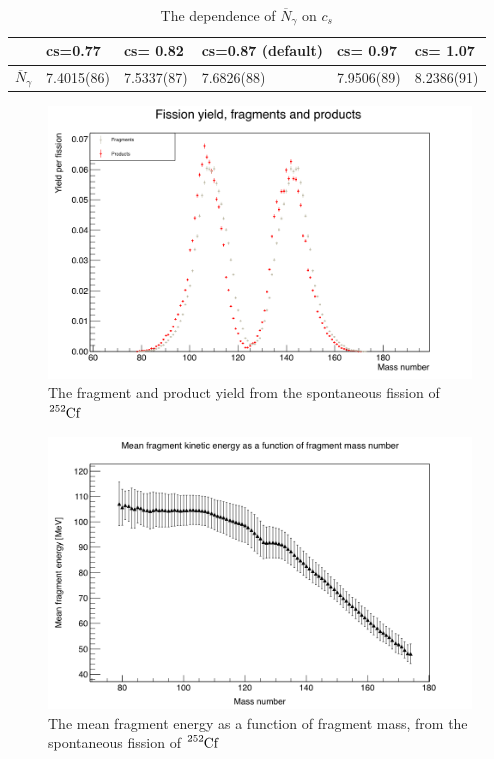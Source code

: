 \documentclass[]{article}
\begin{document}
\begin{table} [H]
	\centering
	\caption{The dependence of  $\overline{N}_{\gamma}$ on $c_s$}
	\begin{tabularx}{\textwidth}{XXXXXX} \hline
		\label{tab:dependence_on_c}
		 & cs=0.77 & cs= 0.82 & cs=0.87 (default) & cs= 0.97 & cs= 1.07 \\ \hline
		$\overline{N}_{\gamma}$ & 7.4015(86) & 7.5337(87) & 7.6826(88) & 7.9506(89) & 8.2386(91) \\
		\hline
	\end{tabularx}
\end{table}

\begin{figure} [H]
	\centering
	\includegraphics[scale=0.37]{Cf252_sf_fragment_product_yield.png}
	\caption{The fragment and product yield from the spontaneous fission of $\ce{^{252}Cf}$}
	\label{fig:Cf252_sf_fragment_product_yield}
\end{figure}

\begin{figure} [H]
	\centering
	\includegraphics[scale=0.37]{Cf252_sf_mean_fragment_kinetic_enery_function_of_fragment_mass_number.png}
	\caption{The mean fragment energy as a function of fragment mass, from the spontaneous fission of $\ce{^{252}Cf}$}
	\label{fig:Cf252_sf_mean_fragment_kinetic_enery_function_of_fragment_mass_number}
\end{figure}
\end{document}
